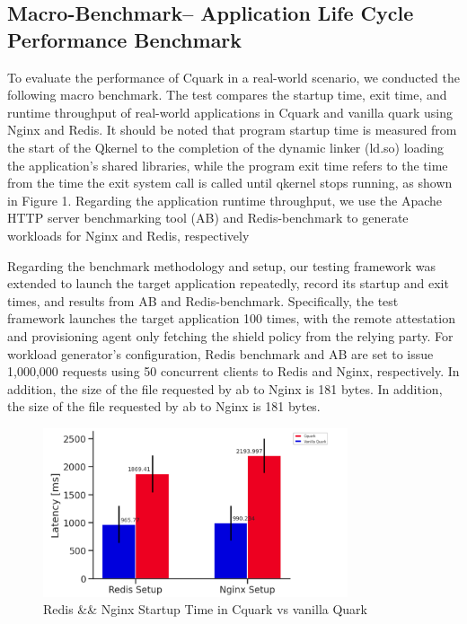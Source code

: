 \subsection{Macro-Benchmark– Application Life Cycle Performance Benchmark}

To evaluate the performance of Cquark in a real-world scenario, we conducted the following macro benchmark. The test compares the startup time, exit time, and runtime throughput of real-world applications in Cquark and vanilla quark using Nginx and Redis. It should be noted that program startup time 
is measured from the start of the Qkernel to the completion of the dynamic linker (ld.so) loading the application's shared libraries, while the program exit time refers to the time from the time the exit system call is called until qkernel stops running, as shown in Figure 1. Regarding the application 
runtime throughput, we use the Apache HTTP server benchmarking tool (AB) and Redis-benchmark to generate workloads for Nginx and Redis, respectively


Regarding the benchmark methodology and setup, our testing framework was extended to launch the target application repeatedly, record its startup and exit times, and results from AB and Redis-benchmark. Specifically, the test framework launches the target application 100 times, with the remote 
attestation and provisioning agent only fetching the shield policy from the relying party. For workload generator’s configuration, Redis benchmark and AB are set to issue 1,000,000 requests using 50 concurrent clients to Redis and Nginx, respectively. In addition, the size of the file requested 
by ab to Nginx is 181 bytes. In addition, the size of the file requested by ab to Nginx is 181 bytes.

\begin{figure}[H]
    \centering
    \includegraphics[width=0.8\textwidth]{images/reds_nginx_startup_comp.PNG}
    \caption[Redis \&\& Nginx Startup Time in Cquark vs vanilla Quark]{Redis \&\& Nginx Startup Time in Cquark vs vanilla Quark}
    \label{fig:reds_nginx_startup_comp}
\end{figure}

